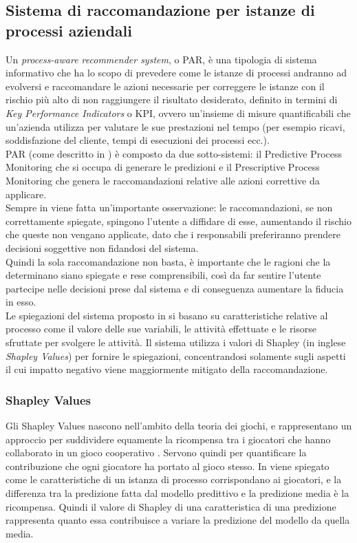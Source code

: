 \subsection{Sistema di raccomandazione per istanze di processi aziendali}
\label{subsec:par-ref}
Un \textit{process-aware recommender system}\cite{paper-padella}, o PAR, è una tipologia di sistema informativo che ha lo scopo di prevedere come le istanze di processi andranno ad evolversi e raccomandare le azioni necessarie per correggere le istanze con il rischio più alto di non raggiungere il risultato desiderato, definito in termini di \textit{Key Performance Indicators} o KPI, ovvero un'insieme di misure quantificabili che un'azienda utilizza per valutare le sue prestazioni nel tempo (per esempio ricavi, soddisfazione del cliente, tempi di esecuzioni dei processi ecc.).
\\
PAR (come descritto in \cite{paper-padella}) è composto da due sotto-sistemi: il Predictive Process Monitoring che si occupa di generare le predizioni e il Prescriptive Process Monitoring che genera le raccomandazioni relative alle azioni correttive da applicare.
\\
Sempre in \cite{paper-padella} viene fatta un'importante osservazione: le raccomandazioni, se non correttamente spiegate, spingono l'utente a diffidare di esse, aumentando il rischio che queste non vengano applicate, dato che i responsabili preferiranno prendere decisioni soggettive non fidandosi del sistema.
\\
Quindi la sola raccomandazione non basta, è importante che le ragioni che la determinano siano spiegate e rese comprensibili, così da far sentire l'utente partecipe nelle decisioni prese dal sistema e di conseguenza aumentare la fiducia in esso.
\\
Le spiegazioni del sistema proposto in \cite{paper-padella} si basano su caratteristiche relative al processo come il valore delle sue variabili, le attività effettuate e le risorse sfruttate per svolgere le attività. Il sistema utilizza i valori di Shapley (in inglese \textit{Shapley Values}) per fornire le spiegazioni, concentrandosi solamente sugli aspetti il cui impatto negativo viene maggiormente mitigato della raccomandazione.


\subsubsection{Shapley Values}
Gli Shapley Values nascono nell'ambito della teoria dei giochi, e rappresentano un approccio per suddividere equamente la ricompensa tra i giocatori che hanno collaborato in un gioco cooperativo \cite{paper-padella}. Servono quindi per quantificare la contribuzione che ogni giocatore ha portato al gioco stesso. In \cite{paper-padella} viene spiegato come le caratteristiche di un istanza di processo corrispondano ai giocatori, e la differenza tra la predizione fatta dal modello predittivo e la predizione media è la ricompensa. Quindi il valore di Shapley di una caratteristica di una predizione rappresenta quanto essa contribuisce a variare la predizione del modello da quella media.

